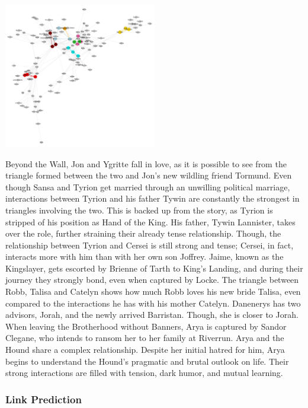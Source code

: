 \documentclass[10pt,twocolumn,letterpaper]{article}
\begin{document}
\begin{center}
    \includegraphics[width=0.5\textwidth]{img/s3/interesting_triangles.jpg}
\end{center}

Beyond the Wall, Jon and Ygritte fall in love, as it is possible to see from the triangle formed between the two and Jon's new wildling friend Tormund. Even though Sansa and Tyrion get married through an unwilling political marriage, interactions between Tyrion and his father Tywin are constantly the strongest in triangles involving the two. This is backed up from the story, as Tyrion is stripped of his position as Hand of the King. His father, Tywin Lannister, takes over the role, further straining their already tense relationship. Though, the relationship between Tyrion and Cersei is still strong and tense; Cersei, in fact, interacts more with him than with her own son Joffrey. 
Jaime, known as the Kingslayer, gets escorted by Brienne of Tarth to King's Landing, and during their journey they strongly bond, even when captured by Locke. The triangle between Robb, Talisa and Catelyn shows how much Robb loves his new bride Talisa, even compared to the interactions he has with his mother Catelyn. Danenerys has two advisors, Jorah, and the newly arrived Barristan. Though, she is closer to Jorah.
When leaving the Brotherhood without Banners, Arya is captured by Sandor Clegane, who intends to ransom her to her family at Riverrun. Arya and the Hound share a complex relationship. Despite her initial hatred for him, Arya begins to understand the Hound's pragmatic and brutal outlook on life. Their strong interactions are filled with tension, dark humor, and mutual learning.



\subsubsection{Link Prediction}
\end{document}
